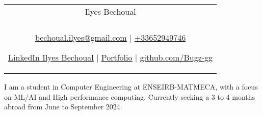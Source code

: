 \documentclass[a4paper,8pt]{article}
\begin{document}
\pagestyle{empty} 


\begin{tabularx}{\linewidth}{@{} C @{}}
\color[HTML]{1C033C} \Huge{Ilyes Bechoual} \\[6pt]
\\
\textcolor[HTML]{371e77}{\underline{\href{mailto:bechoual.ilyes@gmail.com}{\raisebox{-0.05\height}{\faEnvelope} bechoual.ilyes@gmail.com}} $|$}
\textcolor[HTML]{371e77}{\href{tel:+33652949746}{\raisebox{-0.05\height}{\faMobile} +33652949746}}

\textcolor[HTML]{371e77}
{\underline{\href{https://www.linkedin.com/in/ilyes-bechoual/}{\raisebox{-0.05\height}{\faLinkedin} LinkedIn Ilyes Bechoual}} $|$}
\textcolor[HTML]{371e77}
{\underline{\href{https://www.ibechoual-portfolio.codes/}{\raisebox{-0.05\height}{\faGlobe} Portfolio}} $|$}
\textcolor[HTML]{371e77}
{\underline{\href{https://github.com/Bugz-gg}{\raisebox{-0.05\height}{\faGithub} github.com/Bugz-gg}}}
\end{tabularx}

I am a student in Computer Engineering at ENSEIRB-MATMECA, with a focus on ML/AI and High performance computing. Currently seeking a 3 to 4 months abroad from June to September 2024.

\end{document}
